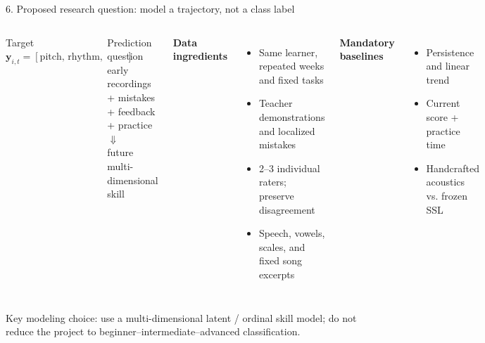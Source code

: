 \documentclass[aspectratio=169,10pt]{ctexbeamer}
\begin{document}
\begin{frame}{6. Proposed research question: model a trajectory, not a class label}
\begin{columns}[T,onlytextwidth]
\begin{block}{Target}
\centering
\large
$\mathbf y_{i,t}=[\text{pitch, rhythm, breath, phonation, register, diction, expression}]$
\end{block}

\begin{block}{Prediction question}
\centering
\large
early recordings + mistakes + feedback + practice\\
$\Downarrow$\\
future multi-dimensional skill
\end{block}

\small
\textbf{Data ingredients}
\begin{itemize}
  \item Same learner, repeated weeks and fixed tasks
  \item Teacher demonstrations and localized mistakes
  \item 2--3 individual raters; preserve disagreement
  \item Speech, vowels, scales, and fixed song excerpts
\end{itemize}

\textbf{Mandatory baselines}
\begin{itemize}
  \item Persistence and linear trend
  \item Current score + practice time
  \item Handcrafted acoustics vs. frozen SSL
\end{itemize}
\end{columns}

\vspace{0.2cm}
\alert{Key modeling choice:} use a multi-dimensional latent / ordinal skill model; do not reduce the project to beginner--intermediate--advanced classification.
\end{frame}
\end{document}
